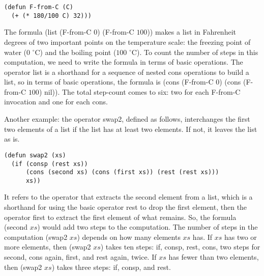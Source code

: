 \begin{code}
\begin{verbatim}
(defun F-from-C (C)
  (+ (* 180/100 C) 32)))
\end{verbatim}
\end{code}

The formula \textsf{(list (F-from-C $0$) (F-from-C $100$))}
makes a list in Fahrenheit degrees of two important
points on the temperature scale:
the freezing point of water ($0$ $^\circ$C) and the boiling point ($100$ $^\circ$C).
To count the number of steps in this computation,
we need to write the formula in terms of basic operations.
The operator \textsf{list} is a shorthand for a sequence of nested
\textsf{cons} operations to build a list,
so in terms of basic operations, the formula is
\textsf{(cons (F-from-C $0$) (cons (F-from-C $100$) nil))}.
The total step-count comes to six: two for each \textsf{F-from-C} invocation
and one for each cons.

Another example:
the operator \textsf{swap2}, defined as follows, interchanges the
first two elements of a list if the list has at least two elements.
If not, it leaves the list as is.

\begin{code}
\begin{verbatim}
(defun swap2 (xs)
  (if (consp (rest xs))
      (cons (second xs) (cons (first xs)) (rest (rest xs)))
      xs))
\end{verbatim}
\end{code}

It refers to the operator that extracts the second element from a list,
which is a shorthand for using the basic operator \textsf{rest} to drop the
first element, then the operator \textsf{first} to extract the first element
of what remains.
\label{steps-in-second-op}So,
the formula \textsf{(second $xs$)} would add two steps
to the computation. The number of steps in the computation \textsf{(swap2 $xs$)}
depends on how many elements $xs$ has. If $xs$ has two or more elements,
then \textsf{(swap2 $xs$)} takes ten steps:
\textsf{if}, \textsf{consp}, \textsf{rest}, \textsf{cons},
two steps for \textsf{second},
\textsf{cons} again, \textsf{first}, and \textsf{rest} again, twice.
If $xs$ has fewer than two elements, then \textsf{(swap2 $xs$)} takes three steps:
\textsf{if}, \textsf{consp}, and \textsf{rest}.

